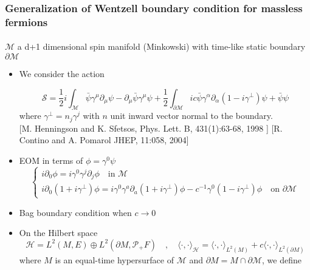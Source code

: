 \documentclass[english]{beamer}
\begin{document}
\begin{frame}[shrink=30]
\frametitle{\small{Generalization of Wentzell boundary condition for massless fermions}}
\framesubtitle{}

$\mathcal{M}$ a d+1 dimensional spin manifold (Minkowski) with time-like static boundary $\partial\mathcal{M}$

\begin{itemize}
\item<2-> We consider the action

\begin{equation*}
\mathcal{S} = \frac{1}{2}i\int_{\mathcal{M}} \bar{\psi} \gamma^\mu \partial_\mu \psi - \partial_\mu \bar{\psi} \gamma^\mu \psi 
+ \frac{1}{2}\int_{\partial \mathcal{M}} ic \bar{\psi} \gamma^\alpha \partial_\alpha (1 - i \gamma^\bot) \psi
+ \bar{\psi} \psi
\end{equation*}
where $\gamma^\bot = n_j\gamma^j$ with $n$ unit inward vector normal to the boundary.\\
\tiny\color{blue}[M. Henningson and K. Sfetsos,
Phys. Lett. B, 431(1):63-68, 1998
] \color{black}\normalsize
\tiny\color{blue} [R. Contino and A. Pomarol JHEP, 11:058, 2004]
\color{black}\normalsize
%
%
\item<3-> EOM in terms of $\phi = \gamma^0 \psi$
\begin{equation*}
\begin{cases}
i \partial_0 \phi = i \gamma^0 \gamma^j \partial_j \phi   \quad \textrm{in $\mathcal{M}$}\\
i \partial_0(1 + i\gamma^\bot) \phi = i\gamma^0 \gamma^a \partial_a (1+ i\gamma^\bot)\phi - c^{-1} \gamma^0(1 - i \gamma^{\bot})\phi \quad \textrm{on $\partial \mathcal{M}$}
\end{cases}
\end{equation*}
%
\item<4-> Bag boundary condition when $c\rightarrow0$ 
%
\item<5-> On the Hilbert space 
\begin{equation*}
\mathcal{H} = L^{2}(M,E)\oplus L^{2}(\partial M, \mathcal{P}_+ F) \quad,\quad
\langle \cdot, \cdot \rangle _\mathcal{H} = \langle \cdot, \cdot \rangle _{L^2(M)} + c \langle \cdot, \cdot \rangle _{L^2(\partial M)}
\end{equation*}
 where $M$ is an equal-time hypersurface of $\mathcal{M}$ and $\partial M = M\cap \partial \mathcal{M}$, we define



\end{itemize}
\end{frame}
\end{document}
